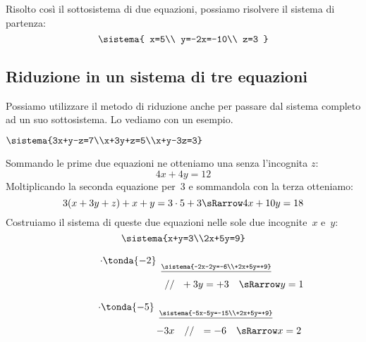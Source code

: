 \begin{soluzione}
Risolto così il sottosistema di due equazioni, possiamo risolvere il sistema 
di partenza:
\[\sistema{
  x=5\\
  y=-2x=-10\\
  z=3
}\]

\end{soluzione}

\subsection{Riduzione in un sistema di tre equazioni}

Possiamo utilizzare il metodo di riduzione anche per  passare dal sistema 
completo ad un suo sottosistema. Lo vediamo con un esempio.

 \begin{esempio}
\(\sistema{3x+y-z=7\\x+3y+z=5\\x+y-3z=3}\)
\vspace{.5em}

\noindent Sommando le prime due equazioni ne otteniamo una senza l'incognita 
\(z\):
\[4x+4y=12\]
Moltiplicando la seconda equazione per~\(3\) e sommandola con la 
terza otteniamo:
\[3(x+3y+z)+x+y=3\cdot 5+3 \sRarrow 4x+10y=18\]
Costruiamo il sistema di queste due equazioni
nelle sole due incognite~\(x\) e~\(y\):
\[\sistema{x+y=3\\2x+5y=9}\]

\hspace{-20mm}
\begin{minipage}{.48\textwidth}
\[\stackrel{
  \begin{array}{l} \cdot \tonda{-2}\\ ~ \end{array}
  \underline{\sistema{-2x-2y=-6\\+2x+5y=+9}}}
  {\qquad \qquad \qquad \qquad 
   ~~~~~~~ // ~~ +3y  =+3 \quad \sRarrow y=1}\]
\end{minipage}
\begin{minipage}{.48\textwidth}
\[\stackrel{
  \begin{array}{l} \cdot \tonda{-5}\\ ~ \end{array}
  \underline{\sistema{-5x-5y=-15\\+2x+5y=+9}}}
  {\qquad \qquad \qquad \qquad 
   ~~~~ -3x ~~~ // ~~ =-6 \quad \sRarrow x=2}\]
\end{minipage}
\vspace{.5em}


\end{esempio}

